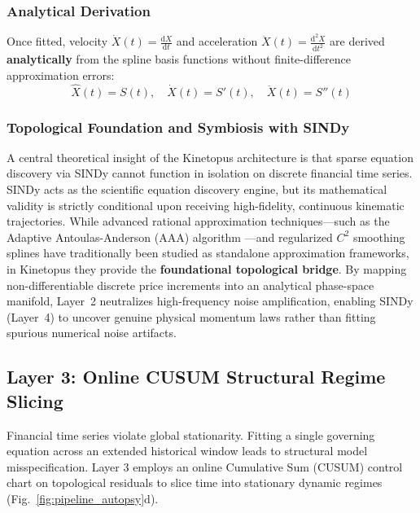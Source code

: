 \documentclass[11pt,a4paper]{article}
\begin{document}
\subsubsection{Analytical Derivation}
Once fitted, velocity $\dot{X}(t) = \frac{\mathrm{d}X}{\mathrm{d}t}$ and acceleration $\ddot{X}(t) = \frac{\mathrm{d}^2 X}{\mathrm{d}t^2}$ are derived \textbf{analytically} from the spline basis functions without finite-difference approximation errors:
\begin{equation}
    \hat{X}(t) = S(t), \quad \dot{X}(t) = S'(t), \quad \ddot{X}(t) = S''(t)
\end{equation}

\subsubsection{Topological Foundation and Symbiosis with SINDy}
A central theoretical insight of the Kinetopus architecture is that sparse equation discovery via SINDy cannot function in isolation on discrete financial time series. SINDy acts as the scientific equation discovery engine, but its mathematical validity is strictly conditional upon receiving high-fidelity, continuous kinematic trajectories. While advanced rational approximation techniques---such as the Adaptive Antoulas-Anderson (AAA) algorithm \cite{nakatsukasa2018aaa}---and regularized $C^2$ smoothing splines \cite{reinsch1967smoothing} have traditionally been studied as standalone approximation frameworks, in Kinetopus they provide the \textbf{foundational topological bridge}. By mapping non-differentiable discrete price increments into an analytical phase-space manifold, Layer~2 neutralizes high-frequency noise amplification, enabling SINDy (Layer~4) to uncover genuine physical momentum laws rather than fitting spurious numerical noise artifacts.

\subsection{Layer 3: Online CUSUM Structural Regime Slicing}
\label{sec:layer3}

Financial time series violate global stationarity. Fitting a single governing equation across an extended historical window leads to structural model misspecification. Layer 3 employs an online Cumulative Sum (CUSUM) control chart \cite{page1954continuous, basseville1993detection} on topological residuals to slice time into stationary dynamic regimes (Fig.~\ref{fig:pipeline_autopsy}d).
\end{document}
